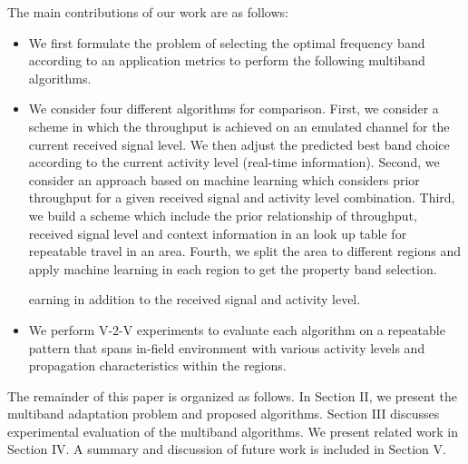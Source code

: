 The main contributions of our work are as follows:
\begin{itemize}
\item We first formulate the problem of selecting the optimal 
frequency band according to 
an application metrics
to perform the following multiband algorithms.
\item We consider four different algorithms for comparison.  First, we consider a scheme
in which the throughput is achieved on an emulated channel for
the current received signal level. We then adjust the predicted best band choice according to the current activity
level (real-time information). 
Second, we consider an approach based on machine learning which
considers prior throughput for a given received signal and activity level
combination.  
Third, we build a scheme which include the prior relationship of throughput, received signal level and context information in an look up table for repeatable travel in an area.
Fourth, we split the area to different regions and apply machine learning in each region to get the property band selection.

earning in addition to the received signal and activity level.
\item We perform V-2-V experiments to evaluate each algorithm on a repeatable pattern that
spans in-field environment with various activity
levels and propagation characteristics within the regions. 
\end{itemize}



The remainder of this paper is organized as follows. In Section II, we present the multiband adaptation problem and proposed algorithms. Section III discusses experimental evaluation of the multiband algorithms. We present related work in Section IV. A summary and discussion of future work is included in Section V.

